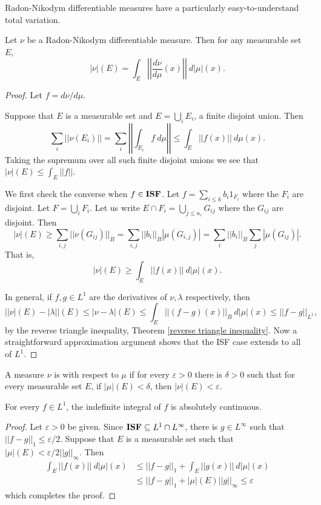Radon-Nikodym differentiable measures have a particularly easy-to-understand total variation.
\begin{theorem}
Let $\nu$ be a Radon-Nikodym differentiable measure. Then for any measurable set $E$,
\[|\nu|(E) = \int_{E} \left|\left|\frac{d\nu}{d\mu}(x)\right|\right|~d|\mu|(x).\]
\end{theorem}
\begin{proof}
Let $f = d\nu/d\mu$.

Suppose that $E$ is a measurable set and $E = \bigcup_{i} E_i$, a finite disjoint union. Then
\[\sum_{i} ||\nu(E_i)|| = \sum_{i} \left|\left| \int_{E_i} f~d\mu\right|\right| \leq \int_{E} ||f(x)||~d\mu(x).\]
Taking the supremum over all such finite disjoint unions we see that $|\nu|(E) \leq \int_{E} ||f||$.

We first check the converse when $f \in \mathbf{ISF}$. Let $f = \sum_{i \leq k} b_{i} 1_{F_i}$ where the $F_i$ are disjoint.
Let $F = \bigcup_{i} F_i$.
Let us write $E \cap F_{i} = \bigcup_{j \leq n_i} G_{ij}$ where the $G_{ij}$ are disjoint. Then
\[|\nu|(E) \geq \sum_{i,j} ||\nu(G_{ij})||_{B} = \sum_{i,j} ||b_i||_{B} |\mu(G_{i,j})| = \sum_{i} ||b_i||_{B} \sum_{j} |\mu(G_{ij})|.\]
That is,
\[|\nu|(E) \geq \int_{E} ||f(x)|| ~d|\mu|(x).\]

In general, if $f,g \in L^1$ are the derivatives of $\nu,\lambda$ respectively, then
\[||\nu|(E) - |\lambda||(E) \leq |\nu - \lambda|(E) \leq \int_{E} ||(f - g)(x)||_{B} ~d|\mu|(x) \leq ||f - g||_{L^1},\]
by the reverse triangle inequality, Theorem \ref{reverse triangle inequality}.
Now a straightforward approximation argument shows that the ISF case extends to all of $L^1$.
\end{proof}

\begin{definition}
A measure $\nu$ is  with respect to $\mu$ if for every $\varepsilon > 0$ there is $\delta > 0$ such that for every measurable set $E$, if $|\mu|(E) < \delta$, then $|\nu|(E) < \varepsilon$.
\end{definition}

\begin{theorem}
\label{indefinite integral is abs cts}
For every $f \in L^1$, the indefinite integral of $f$ is absolutely continuous.
\end{theorem}
\begin{proof}
Let $\varepsilon > 0$ be given.
Since $\mathbf{ISF} \subseteq L^1 \cap L^\infty$, there is $g \in L^\infty$ such that $||f - g||_1 \leq \varepsilon/2$.
Suppose that $E$ is a measurable set such that $|\mu|(E) < \varepsilon/2||g||_\infty$. Then
\begin{align*}
\int_{E} ||f(x)|| ~d|\mu|(x) &\leq ||f - g||_1 + \int_{E} ||g(x)|| ~d|\mu|(x) \\
&\leq ||f - g||_1 + |\mu|(E)||g||_{\infty} \leq \varepsilon
\end{align*}
which completes the proof.
\end{proof}

